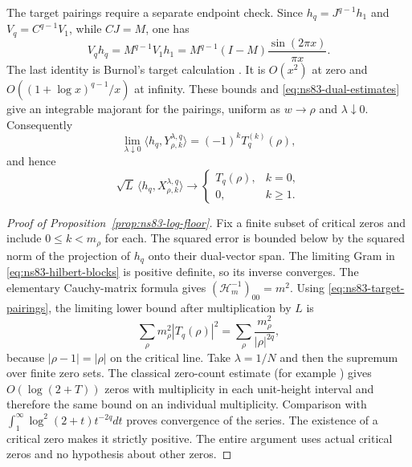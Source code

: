 The target pairings require a separate endpoint check. Since
$h_q=J^{q-1}h_1$ and $V_q=C^{q-1}V_1$, while $CJ=M$, one has
\[
 V_qh_q=M^{q-1}V_1h_1
       =M^{q-1}(I-M)\frac{\sin(2\pi x)}{\pi x}.
\]
The last identity is Burnol's target calculation
\cite[Theorem 5.4]{BurnolLower2002}. It is $O(x^2)$ at zero and
$O((1+\log x)^{q-1}/x)$ at infinity. These bounds and
\eqref{eq:ns83-dual-estimates} give an integrable majorant for the
pairings, uniform as $w\to\rho$ and $\lambda\downarrow0$.
Consequently
\[
 \lim_{\lambda\downarrow0}\langle h_q,Y^{\lambda,q}_{\rho,k}\rangle
       =(-1)^k T_q^{(k)}(\rho),
\]
and hence
\begin{equation}
 \sqrt L\,\langle h_q,X^{\lambda,q}_{\rho,k}\rangle
 \longrightarrow
 \begin{cases}T_q(\rho),&k=0,\\0,&k\geq1.\end{cases}
 \label{eq:ns83-target-pairings}
\end{equation}

\begin{proof}[Proof of Proposition~\ref{prop:ns83-log-floor}]
Fix a finite subset of critical zeros and include $0\leq k<m_\rho$
for each. The squared error is bounded below by the squared norm of the
projection of $h_q$ onto their dual-vector span. The limiting Gram in
\eqref{eq:ns83-hilbert-blocks} is positive definite, so its inverse
converges. The elementary Cauchy-matrix formula gives
$(\mathcal H_m^{-1})_{00}=m^2$. Using
\eqref{eq:ns83-target-pairings}, the limiting lower bound after
multiplication by $L$ is
\[
 \sum_\rho m_\rho^2|T_q(\rho)|^2
 =\sum_\rho\frac{m_\rho^2}{|\rho|^{2q}},
\]
because $|\rho-1|=|\rho|$ on the critical line.
Take $\lambda=1/N$ and then the supremum over finite zero sets.
The classical zero-count estimate (for example \cite{HasanalizadeShenWong2021}) gives $O(\log(2+T))$ zeros with
multiplicity in each unit-height interval and therefore the same bound
on an individual multiplicity. Comparison with
$\int_1^\infty \log^2(2+t)t^{-2q}dt$ proves convergence of the series.
The existence of a critical zero makes it strictly positive. The entire
argument uses actual critical zeros and no hypothesis about other zeros.
\end{proof}

